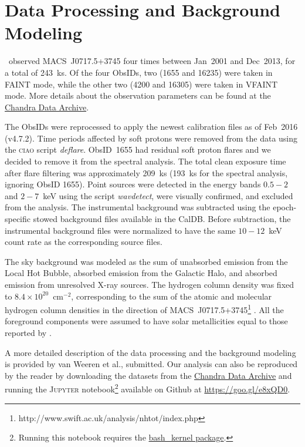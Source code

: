 \section{Data Processing and Background Modeling}
\label{sec:DataAnalysis}

\chandra\ observed MACS~J0717.5+3745 four times between Jan~2001 and Dec~2013, for a total of 243~ks. Of the four ObsIDs, two (1655 and 16235) were taken in FAINT mode, while the other two (4200 and 16305) were taken in VFAINT mode. More details about the observation parameters can be found at the \href{http://cda.harvard.edu/chaser/}{Chandra Data Archive}.

The ObsIDs were reprocessed to apply the newest calibration files as of Feb~2016 (v4.7.2). Time periods affected by soft protons were removed from the data using the \textsc{ciao} script \emph{deflare}. ObsID~1655 had residual soft proton flares and we decided to remove it from the spectral analysis. The total clean exposure time after flare filtering was approximately 209~ks (193~ks for the spectral analysis, ignoring ObsID 1655). Point sources were detected in the energy bands $0.5-2$ and $2-7$~keV using the script \emph{wavdetect}, were visually confirmed, and excluded from the analysis. The instrumental background was subtracted using the epoch-specific stowed background files available in the CalDB. Before subtraction, the instrumental background files were normalized to have the same $10-12$~keV count rate as the corresponding source files. 

The sky background was modeled as the sum of unabsorbed emission from the Local Hot Bubble, absorbed emission from the Galactic Halo, and absorbed emission from unresolved X-ray sources. The hydrogen column density was fixed to $8.4\times 10^{20}$~cm$^{-2}$, corresponding to the sum of the atomic and molecular hydrogen column densities in the direction of MACS~J0717.5+3745\footnote{http://www.swift.ac.uk/analysis/nhtot/index.php} \citep{Kalberla2005, Willingale2013}. All the foreground components were assumed to have solar metallicities equal to those reported by \citet{Feldman1992}. 

A more detailed description of the data processing and the background modeling is provided by van Weeren et al., submitted. Our analysis can also be reproduced by the reader by downloading the datasets from the \href{http://cda.harvard.edu/chaser/}{Chandra Data Archive} and running the \textsc{Jupyter} notebook\footnote{Running this notebook requires the \href{https://github.com/takluyver/bash\_kernel}{bash\_kernel package}.} available on Github at \url{https://goo.gl/e8xQD0}. 
